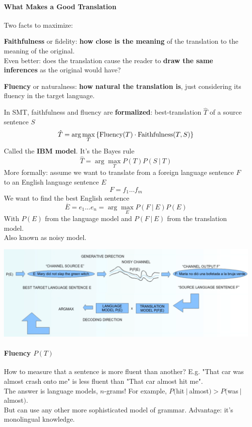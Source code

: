\documentclass[10pt]{report}
\begin{document}
\paragraph{What Makes a Good Translation} Two facts to maximize:
\begin{list}{}{}
	\item \textbf{Faithfulness} or fidelity: \textbf{how close is the meaning} of the translation to the meaning of the original.\\
	Even better: does the translation cause the reader to \textbf{draw the same inferences} as the original would have?
	\item \textbf{Fluency} or naturalness: \textbf{how natural the translation is}, just considering its fluency in the target language.
\end{list}
In SMT, faithfulness and fluency are \textbf{formalized}: best-translation $\hat{T}$ of a source sentence $S$
$$\hat{T}=\arg\max_T \left\{\hbox{Fluency}(T)\cdot\hbox{Faithfulness}(T,S)\right\}$$
Called the \textbf{IBM model}. It's the Bayes rule
$$\hat{T} = \arg\max_T P(T)P(S\:|\:T)$$
More formally: assume we want to translate from a foreign language sentence $F$ to an English language sentence $E$
$$F = f_1 \ldots f_m$$
We want to find the best English sentence
$$\overline{E} = e_1\ldots e_n = \arg\max_E P(F\:|\:E)P(E)$$
With $P(E)$ from the language model and $P(F\:|\:E)$ from the translation model.\\
Also known as noisy model.
\begin{center}
	\includegraphics[scale=0.5]{42.png}
\end{center}
\paragraph{Fluency $P(T)$} How to measure that a sentence is more fluent than another? E.g. "That car was almost crash onto me" is less fluent than "That car almost hit me".\\
The answer is language models, $n$-grams! For example, $P($hit$\:|\:$almost$)>P($was$\:|\:$almost$)$.\\
But can use any other more sophisticated model of grammar. Advantage: it's monolingual knowledge.
\end{document}
